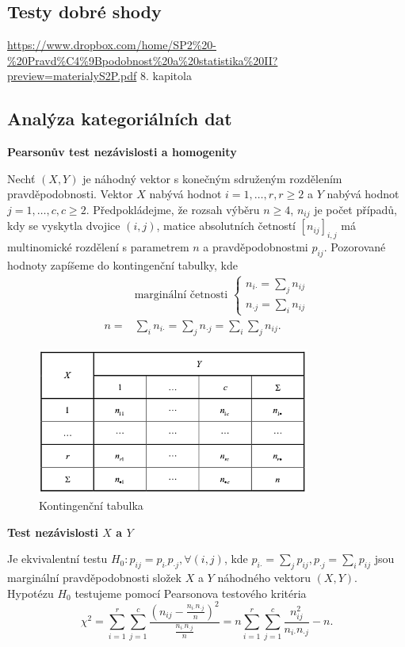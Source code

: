 \documentclass[a4]{report}
\theoremstyle{definition}
\begin{document}
{\subsection{Testy dobré shody}
\url{https://www.dropbox.com/home/SP2\%20-\%20Pravd\%C4\%9Bpodobnost\%20a\%20statistika\%20II?preview=materialyS2P.pdf}
8. kapitola

\subsection{Analýza kategoriálních dat}
\textbf{Pearsonův test nezávislosti a homogenity}

Nechť $(X,Y)$ je náhodný vektor s konečným sdruženým rozdělením pravděpodobnosti. Vektor $X$ nabývá hodnot $i = 1, \ldots, r, r \geq 2$ a $Y$ nabývá hodnot $j = 1, \ldots, c, c \geq 2$. Předpokládejme, že rozsah výběru $n \geq 4$, $n_{ij}$ je počet případů, kdy se vyskytla dvojice $(i, j)$, matice absolutních četností $[n_{ij}]_{i,j}$ má multinomické rozdělení s parametrem $n$ a pravděpodobnostmi $p_{ij}$. Pozorované hodnoty zapíšeme do kontingenční tabulky, kde
\begin{align*}
& \text{marginální četnosti }
\begin{cases}
n_{i \boldsymbol{\cdot}} = \sum_j n_{ij}\\
n_{\boldsymbol{\cdot} j} = \sum_i n_{ij}
\end{cases} \\
n =& \sum_i n_{i \boldsymbol{\cdot}} = \sum_j n_{\boldsymbol{\cdot} j} = \sum_i \sum_j n_{ij}.
\end{align*}

\begin{figure}[H]
\centering
\includegraphics[width=0.8\textwidth]{kontingencni_tabulka.png}
\caption{Kontingenční tabulka}
\end{figure}

\textbf{Test nezávislosti $X$ a $Y$}

Je ekvivalentní testu $H_0: p_{ij} = p_{i \boldsymbol{\cdot}} p_{\boldsymbol{\cdot} j}, \forall (i,j)$, kde $p_{i \boldsymbol{\cdot}} = \sum_j p_{ij}, p_{\boldsymbol{\cdot} j} = \sum_i p_{ij}$ jsou marginální pravděpodobnosti složek $X$ a $Y$ náhodného vektoru $(X,Y)$. Hypotézu $H_0$ testujeme pomocí Pearsonova testového kritéria
\begin{equation*}
\chi^2 = \sum_{i = 1}^r \sum_{ j = 1}^c \frac{(n_{ij} - \frac{n_{i \boldsymbol{\cdot}} n_{\boldsymbol{\cdot} j}}{n})^2}{\frac{n_{i \boldsymbol{\cdot}} n_{\boldsymbol{\cdot} j}}{n}} = n \sum_{i = 1}^r \sum_{ j = 1}^c \frac{n_{ij}^2}{n_{i \boldsymbol{\cdot}} n_{\boldsymbol{\cdot} j}} - n.
\end{equation*}

}
\end{document}
